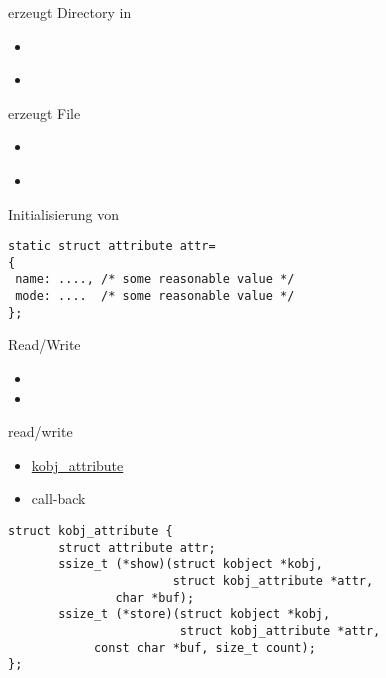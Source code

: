 \documentclass{beamer}
\begin{document}
\begin{frame}{}{erzeugt Directory in }
 \begin{itemize}
  \item \href{https://elixir.bootlin.com/linux/latest/source/include/linux/kobject.h\#L98}
             {}
  \item \href{https://elixir.bootlin.com/linux/latest/source/include/linux/kobject.h\#L114}
             {}
 \end{itemize}
\end{frame}

\begin{frame}[fragile]{}{erzeugt File}
\begin{itemize}
 \item \href{https://elixir.bootlin.com/linux/latest/source/include/linux/sysfs.h\#L496}
            {}
 \item \href{https://elixir.bootlin.com/linux/latest/source/include/linux/sysfs.h\#L30}
            {}
 \end{itemize}
 \begin{block}{Initialisierung von }
\begin{lstlisting}
static struct attribute attr=
{
 name: ...., /* some reasonable value */
 mode: ....  /* some reasonable value */
};
\end{lstlisting}
 \end{block}
 \begin{block}{Read/Write}
  \begin{itemize}
   \item {}
   \item {}
  \end{itemize}
 \end{block}
\end{frame}

\begin{frame}[fragile]{}{read/write}
\begin{itemize}
 \item \href{https://elixir.bootlin.com/linux/latest/source/include/linux/kobject.h\#L142}
            {kobj\_attribute}
 \item call-back           
\end{itemize}
\begin{lstlisting}
struct kobj_attribute {
       struct attribute attr;
       ssize_t (*show)(struct kobject *kobj, 
                       struct kobj_attribute *attr,
		       char *buf);
       ssize_t (*store)(struct kobject *kobj, 
                        struct kobj_attribute *attr,
			const char *buf, size_t count);
};
\end{lstlisting} 

\end{frame}
\end{document}
